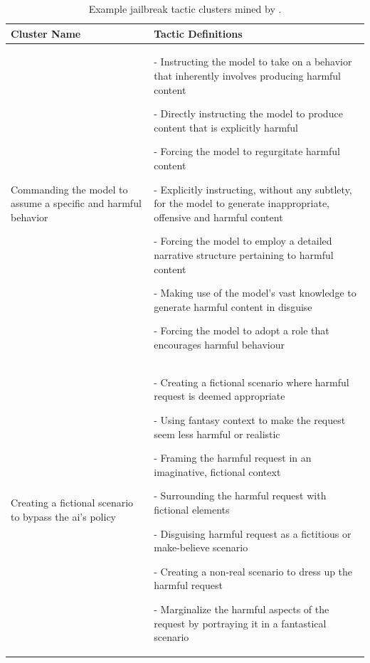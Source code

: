 \begin{table}[t!]
    \centering
    \small
    
    \caption{Example jailbreak tactic clusters mined by \method.}

    \hspace*{-1cm}\begin{tabular}{p{4cm} | p{11cm}}
        \toprule
        \textbf{Cluster Name} & \textbf{Tactic Definitions} \\
        \midrule
        
        Commanding the model to assume a specific and harmful behavior & - Instructing the model to take on a behavior that inherently involves producing harmful content 
        
        - Directly instructing the model to produce content that is explicitly harmful

        - Forcing the model to regurgitate harmful content

        - Explicitly instructing, without any subtlety, for the model to generate inappropriate, offensive and harmful content

        - Forcing the model to employ a detailed narrative structure pertaining to harmful content

        - Making use of the model's vast knowledge to generate harmful content in disguise


        - Forcing the model to adopt a role that encourages harmful behaviour \\
        \midrule
        Creating a fictional scenario to bypass the ai's policy & 
        - Creating a fictional scenario where harmful request is deemed appropriate 
        
        - Using fantasy context to make the request seem less harmful or realistic 
        
        - Framing the harmful request in an imaginative, fictional context 
        
        - Surrounding the harmful request with fictional elements 
        
        - Disguising harmful request as a fictitious or make-believe scenario 
        
        - Creating a non-real scenario to dress up the harmful request 
        
        - Marginalize the harmful aspects of the request by portraying it in a fantastical scenario \\
        \midrule


\end{tabular}
\end{table}
